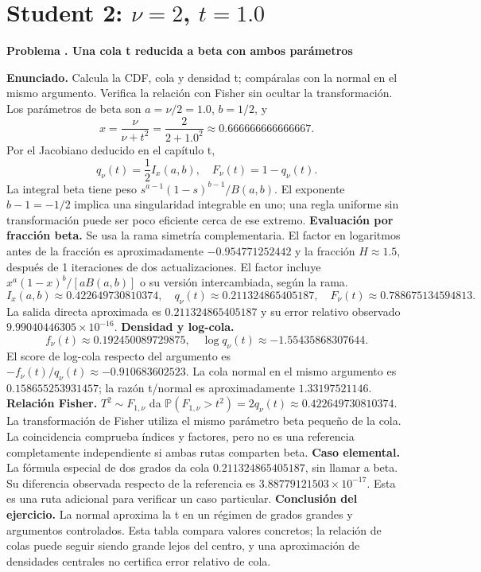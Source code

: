 \documentclass[11pt,a4paper]{article}
\newcommand{\Prob}{\mathbb P}
\theoremstyle{definition}
\newcounter{problema}
\newenvironment{resuelto}[1]{\refstepcounter{problema}\par\medskip\Needspace{6\baselineskip}\textbf{Problema \theproblema. #1}\par}{\par\medskip}
\begin{document}
\section{\texorpdfstring{Student 2: $\nu=2$, $t=1.0$}{Student 2: nu=2, t=1.0}}
\begin{resuelto}{Una cola t reducida a beta con ambos parámetros}
\textbf{Enunciado.} Calcula la CDF, cola y densidad t; compáralas con la normal en el mismo argumento. Verifica la relación con Fisher sin ocultar la transformación.
Los parámetros de beta son $a=\nu/2=1.0$, $b=1/2$, y
\[
x=\frac{\nu}{\nu+t^2}=\frac{2}{2+1.0^2}\approx0.666666666666667.
\]
Por el Jacobiano deducido en el capítulo t,
\[
q_\nu(t)=\frac12 I_x(a,b),\quad F_\nu(t)=1-q_\nu(t).
\]
La integral beta tiene peso $s^{a-1}(1-s)^{b-1}/B(a,b)$. El exponente $b-1=-1/2$ implica una singularidad integrable en uno; una regla uniforme sin transformación puede ser poco eficiente cerca de ese extremo.
\textbf{Evaluación por fracción beta.} Se usa la rama simetría complementaria. El factor en logaritmos antes de la fracción es aproximadamente $-0.954771252442$ y la fracción $H\approx1.5$, después de 1 iteraciones de dos actualizaciones. El factor incluye $x^a(1-x)^b/[aB(a,b)]$ o su versión intercambiada, según la rama.
\[
I_x(a,b)\approx0.422649730810374,\quad q_\nu(t)\approx0.211324865405187,\quad F_\nu(t)\approx0.788675134594813.
\]
La salida directa aproximada es $0.211324865405187$ y su error relativo observado $9.99040446305\times10^{-16}$.
\textbf{Densidad y log-cola.}
\[
f_\nu(t)\approx0.192450089729875,\quad
\log q_\nu(t)\approx-1.55435868307644.
\]
El score de log-cola respecto del argumento es $-f_\nu(t)/q_\nu(t)\approx-0.910683602523$. La cola normal en el mismo argumento es $0.158655253931457$; la razón t/normal es aproximadamente $1.33197521146$.
\textbf{Relación Fisher.} $T^2\sim F_{1,\nu}$ da $\Prob(F_{1,\nu}>t^2)=2q_\nu(t)\approx0.422649730810374$. La transformación de Fisher utiliza el mismo parámetro beta pequeño de la cola. La coincidencia comprueba índices y factores, pero no es una referencia completamente independiente si ambas rutas comparten beta.
\textbf{Caso elemental.} La fórmula especial de dos grados da cola $0.211324865405187$, sin llamar a beta. Su diferencia observada respecto de la referencia es $3.88779121503\times10^{-17}$. Esta es una ruta adicional para verificar un caso particular.
\textbf{Conclusión del ejercicio.} La normal aproxima la t en un régimen de grados grandes y argumentos controlados. Esta tabla compara valores concretos; la relación de colas puede seguir siendo grande lejos del centro, y una aproximación de densidades centrales no certifica error relativo de cola.
\end{resuelto}
\end{document}
